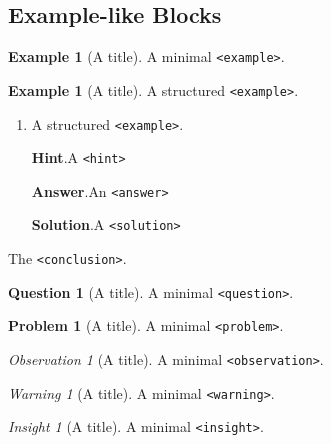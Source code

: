 \documentclass{amsart}
\theoremstyle{plain}%
\theoremstyle{definition}%
\newtheorem{question}[theorem]{Question}
\newtheorem{problem}[theorem]{Problem}
\newtheorem{example}[theorem]{Example}
\theoremstyle{remark}%
\newtheorem{warning}[theorem]{Warning}
\newtheorem{insight}[theorem]{Insight}
\newtheorem{observation}[theorem]{Observation}
\newcommand{\blocktitlefont}{\relax}
\newcommand{\mono}[1]{\texttt{#1}}
\numberwithin{equation}{section}
\begin{document}
\subsection{Example-like Blocks}\label{block-samples-example-like}%
\begin{example}[A title]\label{block-samples-example-like-2}%
%
A minimal \mono{<example>}.%
\end{example}
\begin{example}[A title]\label{block-samples-example-like-3}%
%
A structured \mono{<example>}.%
\begin{enumerate}[font=\bfseries,label=(\alph*),ref=\alph*]%
\item{}A structured \mono{<example>}.%
\par\smallskip%
\noindent\textbf{\blocktitlefont Hint}.\hypertarget{block-samples-example-like-3-3-2}{}\quad{}A \mono{<hint>}%
\par\smallskip%
\noindent\textbf{\blocktitlefont Answer}.\hypertarget{block-samples-example-like-3-3-3}{}\quad{}An \mono{<answer>}%
\par\smallskip%
\noindent\textbf{\blocktitlefont Solution}.\hypertarget{block-samples-example-like-3-3-4}{}\quad{}A \mono{<solution>}%
\end{enumerate}%
The \mono{<conclusion>}.%
\end{example}
\begin{question}[A title]\label{block-samples-example-like-4}%
%
A minimal \mono{<question>}.%
\end{question}
\begin{problem}[A title]\label{block-samples-example-like-5}%
%
A minimal \mono{<problem>}.%
\end{problem}
\begin{observation}[A title]\label{block-samples-example-like-6}%
%
A minimal \mono{<observation>}.%
\end{observation}
\begin{warning}[A title]\label{block-samples-example-like-7}%
%
A minimal \mono{<warning>}.%
\end{warning}
\begin{insight}[A title]\label{block-samples-example-like-8}%
%
A minimal \mono{<insight>}.%
\end{insight}
%
%
\typeout{************************************************}
\typeout{************************************************}
%
\end{document}
